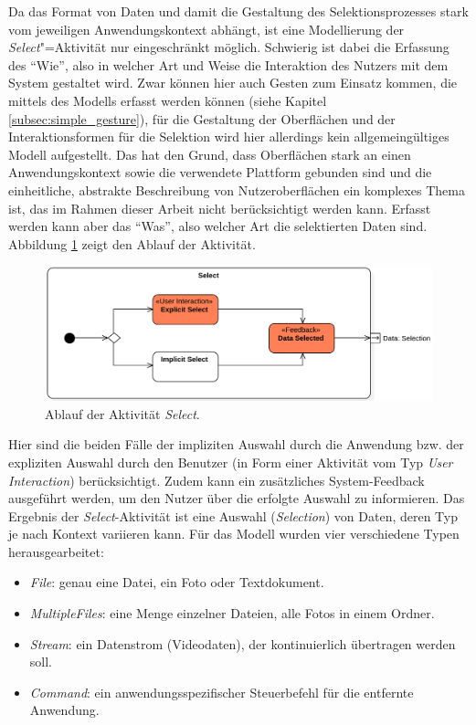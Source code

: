 Da das Format von Daten und damit die Gestaltung des Selektionsprozesses stark vom jeweiligen Anwendungskontext abhängt, ist eine Modellierung der \textit{Select}"=Aktivität nur eingeschränkt möglich. Schwierig ist dabei die Erfassung des "`Wie"', also in welcher Art und Weise die Interaktion des Nutzers mit dem System gestaltet wird. Zwar können hier auch Gesten zum Einsatz kommen, die mittels des Modells erfasst werden können (siehe Kapitel \ref{subsec:simple_gesture}), für die Gestaltung der Oberflächen und der Interaktionsformen für die Selektion wird hier allerdings kein allgemeingültiges Modell aufgestellt. Das hat den Grund, dass Oberflächen stark an einen Anwendungskontext sowie die verwendete Plattform gebunden sind und die einheitliche, abstrakte Beschreibung von Nutzeroberflächen ein komplexes Thema ist, das im Rahmen dieser Arbeit nicht berücksichtigt werden kann. Erfasst werden kann aber das "`Was"', also welcher Art die selektierten Daten sind. Abbildung \ref{fig:select} zeigt den Ablauf der Aktivität.
\begin{figure}[h]
\centering
\includegraphics[width=1\textwidth]{bilder/select.pdf}
\caption{Ablauf der Aktivität \textit{Select}.}
\label{fig:select}
\end{figure}

Hier sind die beiden Fälle der impliziten Auswahl durch die Anwendung bzw. der expliziten Auswahl durch den Benutzer (in Form einer Aktivität vom Typ \textit{User Interaction}) berücksichtigt. Zudem kann ein zusätzliches System-Feedback ausgeführt werden, um den Nutzer über die erfolgte Auswahl zu informieren. Das Ergebnis der \textit{Select}-Aktivität ist eine Auswahl (\textit{Selection}) von Daten, deren Typ je nach Kontext variieren kann. Für das Modell wurden vier verschiedene Typen herausgearbeitet:
\begin{itemize}
\item \textit{File}: genau eine Datei, \zb ein Foto oder Textdokument.
\item \textit{MultipleFiles}: eine Menge einzelner Dateien, \zb alle Fotos in einem Ordner.
\item \textit{Stream}: ein Datenstrom (\zb Videodaten), der kontinuierlich übertragen werden soll.
\item \textit{Command}: ein anwendungsspezifischer Steuerbefehl für die entfernte Anwendung.
\end{itemize}

